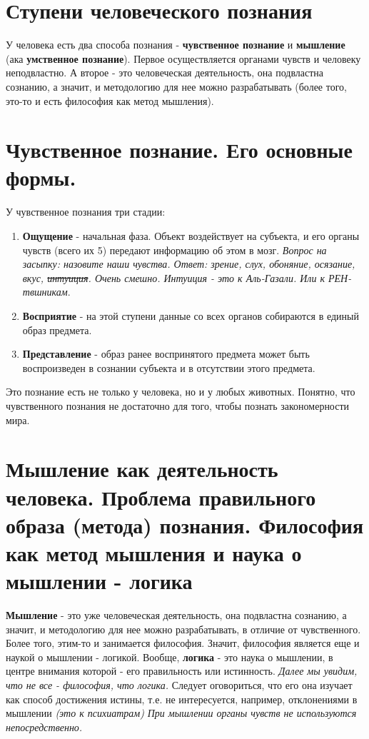 \section{Ступени человеческого познания}
У человека есть два способа познания - \textbf{чувственное познание} и \textbf{мышление} (ака \textbf{умственное познание}).
Первое осуществляется органами чувств и человеку неподвластно.
А второе - это человеческая деятельность, она подвластна сознанию, а значит, и методологию для нее можно разрабатывать (более того, это-то и есть философия как метод мышления).

\section{Чувственное познание. Его основные формы.}
У чувственное познания три стадии:
\begin{enumerate}
\item \textbf{Ощущение} - начальная фаза. Объект воздействует на субъекта, и его органы чувств (всего их 5) передают информацию об этом в мозг. \textit{Вопрос на засыпку: назовите наши чувства. Ответ: зрение, слух, обоняние, осязание, вкус, \sout{интуиция}. Очень смешно. Интуиция - это к Аль-Газали. Или к РЕН-твшникам}.
\item \textbf{Восприятие} - на этой ступени данные со всех органов собираются в единый образ предмета.
\item \textbf{Представление} - образ ранее воспринятого предмета может быть воспроизведен в сознании субъекта и в отсутствии этого предмета.
\end{enumerate}
Это познание есть не только у человека, но и у любых животных. Понятно, что чувственного познания не достаточно для того, чтобы познать закономерности мира.

\section{Мышление как деятельность человека. Проблема правильного образа (метода) познания. Философия как метод мышления и наука о мышлении - логика}
\textbf{Мышление} - это уже человеческая деятельность, она подвластна сознанию, а значит, и методологию для нее можно разрабатывать, в отличие от чувственного.
Более того, этим-то и занимается философия.
Значит, философия является еще и наукой о мышлении - логикой. Вообще, \textbf{логика} - это наука
о мышлении, в центре внимания которой - его правильность или истинность.\textit{ Далее мы увидим, что не все - философия, что логика.
} Следует оговориться, что его она изучает как способ достижения истины, т.е. не интересуется, например, отклонениями в мышлении \textit{(это к психиатрам)} \textit{ При мышлении органы чувств не используются непосредственно. }

